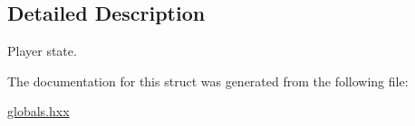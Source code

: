 \subsection{Detailed Description}
Player state. 

The documentation for this struct was generated from the following file\-:\begin{DoxyCompactItemize}
\item 
\hyperlink{globals_8hxx}{globals.\-hxx}\end{DoxyCompactItemize}
